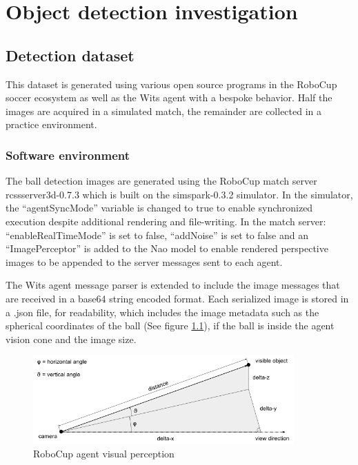 \documentclass[a4paper,twoside,12pt]{report}
\begin{document}
\chapter{Object detection investigation}

\section{Detection dataset}
This dataset is generated using various open source programs in the RoboCup soccer ecosystem as well as the Wits agent with a bespoke behavior. Half the images are acquired in a simulated match, the remainder are collected in a practice environment.

\subsection{Software environment}
The ball detection images are generated using the RoboCup match server rcssserver3d-0.7.3 which is built on the simspark-0.3.2 simulator. In the simulator, the ``agentSyncMode'' variable is changed to true to enable synchronized execution despite additional rendering and file-writing. In the match server: ``enableRealTimeMode'' is set to false, ``addNoise'' is set to false and an ``ImagePerceptor'' is added to the Nao model to enable rendered perspective images to be appended to the server messages \citep{perceptors} sent to each agent.  

The Wits agent message parser is extended to include the image messages that are received in a base64 string encoded format. Each serialized image is stored in a .json file, for readability, which includes the image metadata such as the spherical coordinates of the ball (See figure \ref{fig:spherical}), if the ball is inside the agent vision cone and the image size. 

\begin{figure}[h!]
\begin{center}
\includegraphics[width=10cm]{images/Vision_Perception.png}
\caption{RoboCup agent visual perception \citep{perceptors}}
\label{fig:spherical}
\end{center}
\end{figure}
\end{document}
